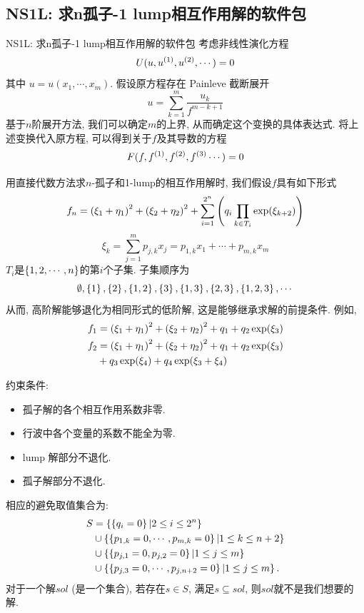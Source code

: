 \subsection{NS1L: 求n孤子-1 lump相互作用解的软件包}
\begin{frame}{NS1L: 求n孤子-1 lump相互作用解的软件包}
考虑非线性演化方程
\[
    U(u,u^{(1)},u^{(2)},\cdots)=0 
\]
其中 $u=u(x_1,\cdots,x_m)$. 假设原方程存在 Painleve 截断展开  
\[
    u=\sum_{k=1}^m{\frac{u_k}{f^{m-k+1}}}
\]
基于$n$阶展开方法, 我们可以确定$m$的上界, 从而确定这个变换的具体表达式. 将上述变换代入原方程, 可以得到关于$f$及其导数的方程
\[
    F(f,f^{(1)},f^{(2)},f^{(3)}\cdots)=0
\]
\end{frame}
\begin{frame}
\small 
用直接代数方法求$n$-孤子和1-lump的相互作用解时, 我们假设$f$具有如下形式 
\[
    f_n=\left(\xi_1+\eta_1\right)^2+\left(\xi_2+\eta_2\right)^2+\sum_{i=1}^{2^n}\left(q_i\prod_{k \in T_i}{\exp(\xi_{k+2})}\right)
\]
\[
    \xi_k=\sum_{j=1}^m{p_{j,k}x_j}=p_{1,k}x_1+\cdots+p_{m,k}x_m
\]
$T_i$是$\left\{1,2,\cdots,n\right\}$的第$i$个子集. 子集顺序为
\[
    \emptyset,\left\{1\right\},\left\{2\right\},\left\{1,2\right\},\left\{3\right\},\left\{1,3\right\},\left\{2,3\right\},\left\{1,2,3\right\},\cdots 
\]
从而, 高阶解能够退化为相同形式的低阶解, 这是能够继承求解的前提条件. 例如, 
\[
\begin{aligned}
    f_1 &= \left(\xi_1+\eta_1\right)^2+\left(\xi_2+\eta_2\right)^2+q_1+q_2 \exp(\xi_3) \\ 
    f_2 &= \left(\xi_1+\eta_1\right)^2+\left(\xi_2+\eta_2\right)^2+q_1+q_2 \exp(\xi_3) \\
        & +q_3 \exp(\xi_4) + q_4 \exp(\xi_3+\xi_4)
\end{aligned}
\]
\end{frame}

\begin{frame}
约束条件:
\begin{itemize}
\item 孤子解的各个相互作用系数非零.
\item 行波中各个变量的系数不能全为零. 
\item lump 解部分不退化.
\item 孤子解部分不退化. 
\end{itemize}
相应的避免取值集合为: 
\[
\begin{aligned}
    S&=\left\{\left\{q_i=0\right\}|2\le i \le 2^n\right\} \\ 
        &\cup \left\{\left\{p_{1,k}=0,\cdots,p_{m,k}=0\right\}|1\le k \le n+2\right\}  \\
        &\cup \left\{\left\{p_{j,1}=0,p_{j,2}=0\right\}|1\le j \le m\right\} \\ 
        &\cup \left\{\left\{p_{j,3}=0,\cdots,p_{j,n+2}=0\right\}|1\le j \le m\right\} .  
\end{aligned}
\]
对于一个解$sol$ (是一个集合), 若存在$s\in S$, 满足$s\subseteq sol$, 则$sol$就不是我们想要的解.
\end{frame}

